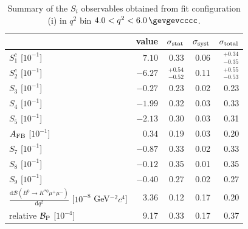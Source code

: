 \begin{table}\centering
\caption{Summary of the $S_{i}$ observables obtained from fit configuration (i) in $q^{2}$ bin \mbox{$4.0 < q^{2} < 6.0\,\gevgevcccc$}.}
\label{sec:fit_results:si_s1c:table:summary_bin3}
\begin{tabular}{lrrrr}
\toprule
 & value & $\sigma_{\rm stat}$ & $\sigma_{\rm syst}$ & $\sigma_{\rm total}$ \\
\midrule
$S_{1}^{c}$ [$ 10^{-1}$] & $7.10$ & 0.33 & 0.06 & $^{+0.34}_{-0.35}$ \\
$S_{2}^{c}$ [$ 10^{-1}$] & $-6.27$ & $^{+0.54}_{-0.52}$ & 0.11 & $^{+0.55}_{-0.53}$ \\
$S_{3}$ [$ 10^{-1}$] & $-0.27$ & 0.23 & 0.02 & 0.23 \\
$S_{4}$ [$ 10^{-1}$] & $-1.99$ & 0.32 & 0.03 & 0.33 \\
$S_{5}$ [$ 10^{-1}$] & $-2.13$ & 0.30 & 0.03 & 0.31 \\
$A_{\rm FB}$ [$ 10^{-1}$] & $0.34$ & 0.19 & 0.03 & 0.20 \\
$S_{7}$ [$ 10^{-1}$] & $-0.87$ & 0.33 & 0.02 & 0.33 \\
$S_{8}$ [$ 10^{-1}$] & $-0.12$ & 0.35 & 0.01 & 0.35 \\
$S_{9}$ [$ 10^{-1}$] & $-0.40$ & 0.27 & 0.02 & 0.27 \\
\midrule
$\frac{\mathrm{d}\mathcal{B}(B^{0}\to K^{\ast 0}\mu^{+}\mu^{-})}{\mathrm{d} q^{2}}$ [$ 10^{-8}$ GeV$^{-2}c^{4}$] & 3.36 & 0.12 & 0.17 & 0.20 \\
relative $\mathcal{B}_{\rm P}$ [$10^{-4}$] & 9.17 & 0.33 & 0.17 & 0.37 \\
\bottomrule
\end{tabular}
\end{table}
